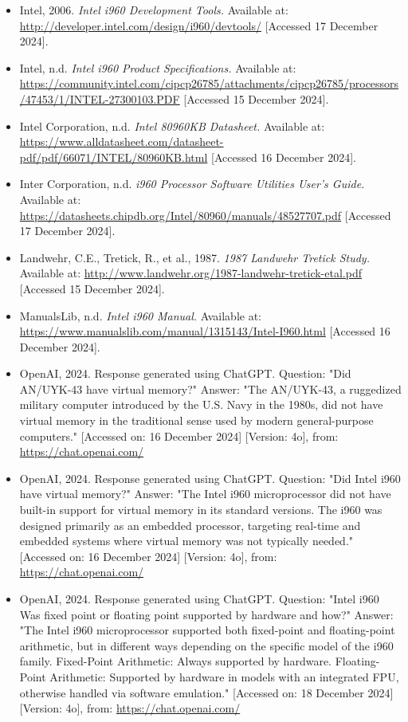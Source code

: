 \documentclass{article}
\begin{document}
\begin{itemize}
\item Intel, 2006. \textit{Intel i960 Development Tools.} Available at: \url{http://developer.intel.com/design/i960/devtools/} [Accessed 17 December 2024].

\item Intel, n.d. \textit{Intel i960 Product Specifications.} Available at: \url{https://community.intel.com/cipcp26785/attachments/cipcp26785/processors/47453/1/INTEL-27300103.PDF} [Accessed 15 December 2024].

\item Intel Corporation, n.d. \textit{Intel 80960KB Datasheet.} Available at: \url{https://www.alldatasheet.com/datasheet-pdf/pdf/66071/INTEL/80960KB.html} [Accessed 16 December 2024].

\item Inter Corporation, n.d. \textit{i960 Processor Software Utilities User’s Guide.} Available at: \url{https://datasheets.chipdb.org/Intel/80960/manuals/48527707.pdf} [Accessed 17 December 2024].

\item Landwehr, C.E., Tretick, R., et al., 1987. \textit{1987 Landwehr Tretick Study.} Available at: \url{http://www.landwehr.org/1987-landwehr-tretick-etal.pdf} [Accessed 15 December 2024].

\item ManualsLib, n.d. \textit{Intel i960 Manual.} Available at: \url{https://www.manualslib.com/manual/1315143/Intel-I960.html} [Accessed 16 December 2024].

\item OpenAI, 2024. Response generated using ChatGPT. Question: "Did AN/UYK-43 have virtual memory?" Answer: "The AN/UYK-43, a ruggedized military computer introduced by the U.S. Navy in the 1980s, did not have virtual memory in the traditional sense used by modern general-purpose computers." [Accessed on: 16 December 2024] [Version: 4o], from: \url{https://chat.openai.com/}

\item OpenAI, 2024. Response generated using ChatGPT. Question: "Did Intel i960 have virtual memory?" Answer: "The Intel i960 microprocessor did not have built-in support for virtual memory in its standard versions. The i960 was designed primarily as an embedded processor, targeting real-time and embedded systems where virtual memory was not typically needed." [Accessed on: 16 December 2024] [Version: 4o], from: \url{https://chat.openai.com/}

\item OpenAI, 2024. Response generated using ChatGPT. Question: "Intel i960 Was fixed point or floating point supported by hardware and how?" Answer: "The Intel i960 microprocessor supported both fixed-point and floating-point arithmetic, but in different ways depending on the specific model of the i960 family. Fixed-Point Arithmetic: Always supported by hardware. Floating-Point Arithmetic: Supported by hardware in models with an integrated FPU, otherwise handled via software emulation." [Accessed on: 18 December 2024] [Version: 4o], from: \url{https://chat.openai.com/}


\end{itemize}
\end{document}

